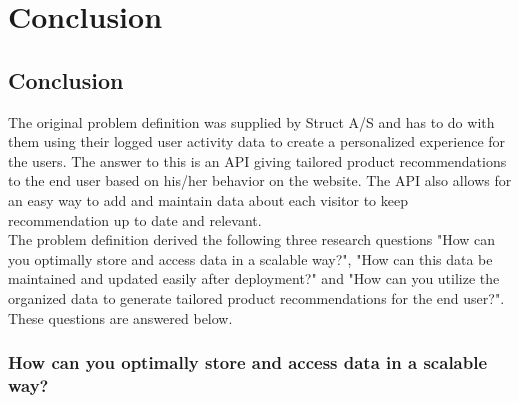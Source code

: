 
\chapter{Conclusion} %

\label{Chapter8} %


\section{Conclusion}

The original problem definition was supplied by Struct A/S and has to do with them using their logged user activity data to create a personalized experience for the users. The answer to this is an API giving tailored product recommendations to the end user based on his/her behavior on the website. The API also allows for an easy way to add and maintain data about each visitor to keep recommendation up to date and relevant. \\
The problem definition derived the following three research questions "How can you optimally store and access data in a scalable way?",  "How can this data be maintained and updated easily after deployment?" and "How can you utilize the organized data to generate tailored product recommendations for the end user?". These questions are answered below.

\subsection{How can you optimally store and access data in a scalable way?}
